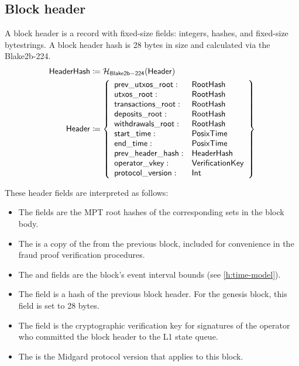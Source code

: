 \documentclass[../midgard.tex]{subfiles}
\begin{document}
\subsection{Block header}
\label{h:block-header}

A block header is a record with fixed-size fields: integers, hashes, and fixed-size bytestrings.
A block header hash is 28 bytes in size and calculated via the Blake2b-224.
\begin{equation*}
\begin{split}
  \mathsf{HeaderHash} &\coloneq \mathcal{H}_{\mathsf{Blake2b-224}}(\mathsf{Header}) \\
  \mathsf{Header} &\coloneq \left\{
    \begin{array}{ll}
        \mathsf{prev\_utxos\_root} : & \mathsf{RootHash} \\
        \mathsf{utxos\_root} : & \mathsf{RootHash} \\
        \mathsf{transactions\_root} : & \mathsf{RootHash} \\
        \mathsf{deposits\_root} : & \mathsf{RootHash} \\
        \mathsf{withdrawals\_root} : & \mathsf{RootHash} \\
        \mathsf{start\_time} : & \mathsf{PosixTime} \\
        \mathsf{end\_time} : & \mathsf{PosixTime} \\
        \mathsf{prev\_header\_hash} : & \mathsf{HeaderHash} \\
        \mathsf{operator\_vkey} : & \mathsf{VerificationKey} \\
        \mathsf{protocol\_version} : & \mathsf{Int} \\
    \end{array} \right\}
\end{split}
\end{equation*}

These header fields are interpreted as follows:
\begin{itemize}
    \item The  fields are the MPT root hashes of the corresponding sets in the block body.
    \item The  is a copy of the  from the previous block, included for convenience in the fraud proof verification procedures.
    \item The  and  fields are the block's event interval bounds (see \cref{h:time-model}).
    \item The  field is a hash of the previous block header. For the genesis block, this field is set to 28  bytes.
    \item The  field is the cryptographic verification key for signatures of the operator who committed the block header to the L1 state queue.
    \item The  is the Midgard protocol version that applies to this block.
\end{itemize}
\end{document}
